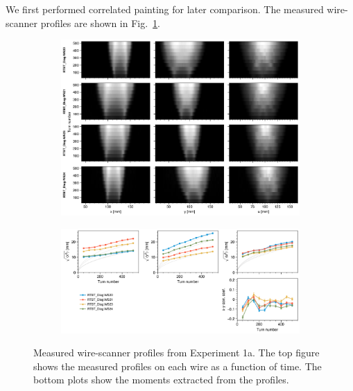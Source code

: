 We first performed correlated painting for later comparison. The measured wire-scanner profiles are shown in Fig.~\ref{fig:exp1a_wsmeas}.
%
\begin{figure}[!p]
    \centering
    \begin{subfigure}{\textwidth}
        \includegraphics[width=\textwidth]{Images/chapter5/exp1a/waterfall.png}
    \end{subfigure}
    \vfill
    \vspace*{1.25cm}
    \vfill
    \begin{subfigure}{\textwidth}
        \includegraphics[width=\textwidth]{Images/chapter5/exp1a/rms.png}
    \end{subfigure}
    \caption{Measured wire-scanner profiles from Experiment 1a. The top figure shows the measured profiles on each wire as a function of time. The bottom plots show the moments extracted from the profiles.}
    \label{fig:exp1a_wsmeas}
\end{figure}
%
%
